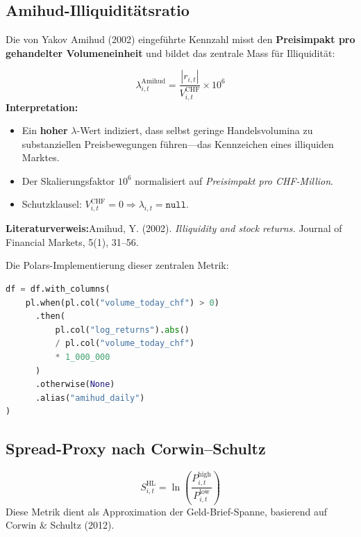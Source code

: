 \documentclass[11pt, a4paper, oneside, openany]{report}
\newcommand{\code}[1]{{\codefont\small\textcolor{DeepNavy}{#1}}}
\begin{document}
\subsection{Amihud-Illiquiditätsratio}

Die von Yakov Amihud (2002) eingeführte Kennzahl misst den \textbf{Preisimpakt pro gehandelter Volumeneinheit} und bildet das zentrale Mass für Illiquidität:

\begin{mathbox}
\[
  \boxed{\;\lambda_{i,t}^{\text{Amihud}} = \frac{|r_{i,t}|}{V_{i,t}^{\text{CHF}}} \times 10^{6}\;}
\]
\textbf{Interpretation:}
\begin{itemize}
  \item Ein \textbf{hoher} $\lambda$-Wert indiziert, dass selbst geringe Handelsvolumina zu substanziellen Preisbewegungen führen\;---\;das Kennzeichen eines illiquiden Marktes.
  \item Der Skalierungsfaktor $10^6$ normalisiert auf \textit{Preisimpakt pro CHF-Million}.
  \item Schutzklausel: $V_{i,t}^{\text{CHF}} = 0 \Rightarrow \lambda_{i,t} = \texttt{null}$.
\end{itemize}

\textbf{Literaturverweis:}\;Amihud, Y. (2002). \textit{Illiquidity and stock returns.} Journal of Financial Markets, 5(1), 31--56.
\end{mathbox}

\noindent Die Polars-Implementierung dieser zentralen Metrik:

\begin{lstlisting}[language=Python, caption={Amihud-Ratio in Polars (\code{metrics.py})}]
df = df.with_columns(
    pl.when(pl.col("volume_today_chf") > 0)
      .then(
          pl.col("log_returns").abs()
          / pl.col("volume_today_chf")
          * 1_000_000
      )
      .otherwise(None)
      .alias("amihud_daily")
)
\end{lstlisting}

\subsection{Spread-Proxy nach Corwin--Schultz}

\begin{mathbox}
\[
  S_{i,t}^{\text{HL}} = \ln\!\left(\frac{P_{i,t}^{\text{high}}}{P_{i,t}^{\text{low}}}\right)
\]
Diese Metrik dient als Approximation der Geld-Brief-Spanne, basierend auf Corwin \& Schultz (2012).
\end{mathbox}
\end{document}
